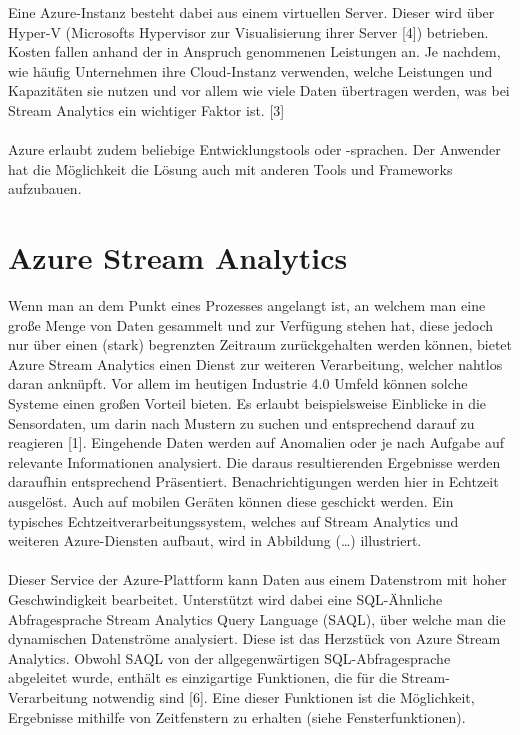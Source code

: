 Eine Azure-Instanz besteht dabei aus einem virtuellen Server. Dieser wird über Hyper-V (Microsofts Hypervisor zur Visualisierung ihrer Server [4]) betrieben. Kosten fallen anhand der in Anspruch genommenen Leistungen an. Je nachdem, wie häufig Unternehmen ihre Cloud-Instanz verwenden, welche Leistungen und Kapazitäten sie nutzen und vor allem wie viele Daten übertragen werden, was bei Stream Analytics ein wichtiger Faktor ist. [3]\\ \\
Azure erlaubt zudem beliebige Entwicklungstools oder -sprachen. Der Anwender hat die Möglichkeit die Lösung auch mit anderen Tools und Frameworks aufzubauen. 

\section{Azure Stream Analytics}
Wenn man an dem Punkt eines Prozesses angelangt ist, an welchem man eine große Menge von Daten gesammelt und zur Verfügung stehen hat, diese jedoch nur über einen (stark) begrenzten Zeitraum zurückgehalten werden können, bietet Azure Stream Analytics einen Dienst zur weiteren Verarbeitung, welcher nahtlos daran anknüpft. Vor allem im heutigen Industrie 4.0 Umfeld können solche Systeme einen großen Vorteil bieten. Es erlaubt beispielsweise Einblicke in die Sensordaten, um darin nach Mustern zu suchen und entsprechend darauf zu reagieren [1]. Eingehende Daten werden auf Anomalien oder je nach Aufgabe auf relevante Informationen analysiert. Die daraus resultierenden Ergebnisse werden daraufhin entsprechend Präsentiert. Benachrichtigungen werden hier in Echtzeit ausgelöst. Auch auf mobilen Geräten können diese geschickt werden. Ein typisches Echtzeitverarbeitungssystem, welches auf Stream Analytics und weiteren Azure-Diensten aufbaut, wird in Abbildung (…) illustriert.\\ \\
Dieser Service der Azure-Plattform kann Daten aus einem Datenstrom mit hoher Geschwindigkeit bearbeitet. Unterstützt wird dabei eine SQL-Ähnliche Abfragesprache Stream Analytics Query Language (SAQL), über welche man die dynamischen Datenströme analysiert. Diese ist das Herzstück von Azure Stream Analytics. Obwohl SAQL von der allgegenwärtigen SQL-Abfragesprache abgeleitet wurde, enthält es einzigartige Funktionen, die für die Stream-Verarbeitung notwendig sind [6]. Eine dieser Funktionen ist die Möglichkeit, Ergebnisse mithilfe von Zeitfenstern zu erhalten (siehe Fensterfunktionen). \\ \\
